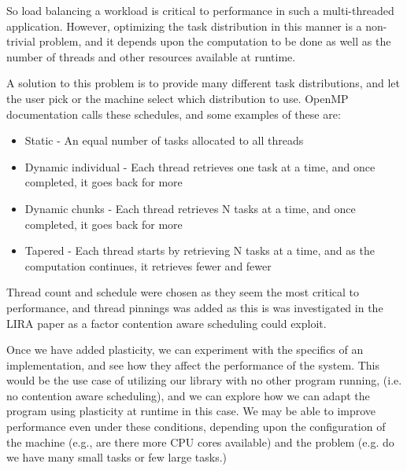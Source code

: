 So load balancing a workload is critical to performance in such a multi-threaded application. However, optimizing the task distribution in this manner is a non-trivial problem, and it depends upon the computation to be done as well as the number of threads and other resources available at runtime.

A solution to this problem is to provide many different task distributions, and let the user pick or the machine select which distribution to use. OpenMP documentation calls these schedules, and some examples of these are:

\begin{itemize}
	\item Static - An equal number of tasks allocated to all threads
	\item Dynamic individual - Each thread retrieves one task at a time, and once completed, it goes back for more
	\item Dynamic chunks - Each thread retrieves N tasks at a time, and once completed, it goes back for more
	\item Tapered - Each thread starts by retrieving N tasks at a time, and as the computation continues, it retrieves fewer and fewer
\end{itemize}

Thread count and schedule were chosen as they seem the most critical to performance, and thread pinnings was added as this is was investigated in the LIRA paper \cite{lira} as a factor contention aware scheduling could exploit.

Once we have added plasticity, we can experiment with the specifics of an implementation, and see how they affect the performance of the system. This would be the use case of utilizing our library with no other program running, (i.e. no contention aware scheduling), and we can explore how we can adapt the program using plasticity at runtime in this case. We may be able to improve performance even under these conditions, depending upon the configuration of the machine (e.g., are there more CPU cores available) and the problem (e.g. do we have many small tasks or few large tasks.) 



